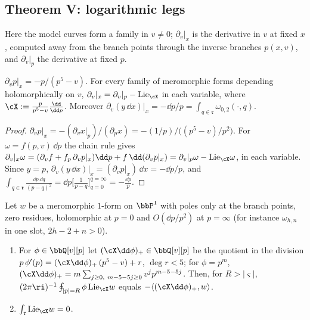 \subsection{Theorem V: logarithmic legs}
\label{sec:mod-V}

Here the model curves form a family in $v\neq 0$; $\partial_v|_x$ is the derivative in $v$ at fixed $x$, computed away from the branch points through the inverse branches $p(x,v)$, and $\partial_v|_p$ the derivative at fixed $p$.

\begin{lem}
\label{lem:mod-fixedx}
$\partial_vp|_x=-p/(p^5-v)$. For every family of meromorphic forms depending holomorphically on $v$, $\partial_v|_x=\partial_v|_p-\mathrm{Lie}_{\cX}$ in each variable, where $\cX:=\frac{p}{p^5-v}\frac{\dd}{\dd p}$. Moreover $\partial_v(y\,\dd x)|_x=-\dd p/p=\int_{q\in\mathfrak r}\omega_{0,2}(\cdot,q)$.
\end{lem}

\begin{proof}
$\partial_vp|_x=-(\partial_vx|_p)/(\partial_px)=-(1/p)\big/\big((p^5-v)/p^2\big)$. For $\omega=f(p,v)\,\dd p$ the chain rule gives $\partial_v|_x\omega=(\partial_vf+f_p\,\partial_vp|_x)\dd p+f\,\dd(\partial_vp|_x)=\partial_v|_p\omega-\mathrm{Lie}_{\cX}\omega$, in each variable. Since $y=p$, $\partial_v(y\,\dd x)|_x=(\partial_vp|_x)\,\dd x=-\dd p/p$, and $\int_{q\in\mathfrak r}\frac{\dd p\,\dd q}{(p-q)^2}=\dd p\big[\frac{1}{p-q}\big]_{q=0}^{q=\infty}=-\frac{\dd p}{p}$.
\end{proof}

\begin{lem}
\label{lem:mod-ibp}
Let $w$ be a meromorphic $1$-form on $\bbP^1$ with poles only at the branch points, zero residues, holomorphic at $p=0$ and $O(\dd p/p^2)$ at $p=\infty$ (for instance $\omega_{h,n}$ in one slot, $2h-2+n>0$).
\begin{enumerate}
\item For $\phi\in\bbQ[v][p]$ let $(\cX\dd\phi)_+\in\bbQ[v][p]$ be the quotient in the division $p\,\phi'(p)=(\cX\dd\phi)_+\,(p^5-v)+r$, $\deg r<5$; for $\phi=p^m$, $(\cX\dd\phi)_+=m\sum_{j\geq 0,\ m-5-5j\geq 0}v^jp^{m-5-5j}$. Then, for $R>|\varsigma|$, $(2\pi\ri)^{-1}\oint_{|p|=R}\phi\,\mathrm{Lie}_{\cX}w$ equals $-\langle(\cX\dd\phi)_+,w\rangle$.
\item $\int_{\mathfrak r}\mathrm{Lie}_{\cX}w=0$.
\end{enumerate}
\end{lem}

